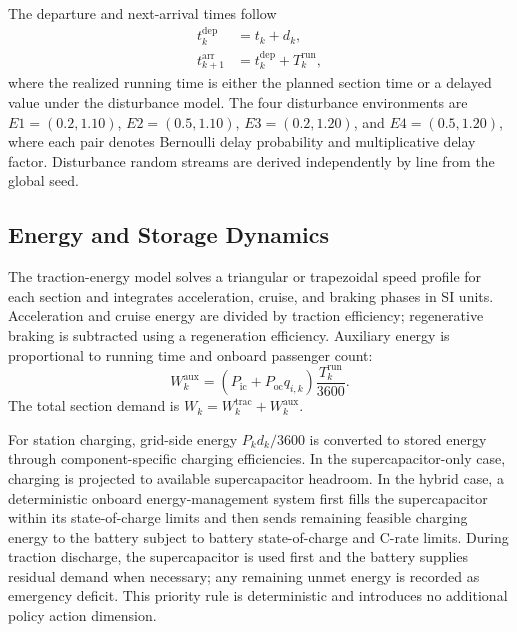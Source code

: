 \documentclass[conference]{IEEEtran}
\begin{document}
The departure and next-arrival times follow
\begin{align}
    t^{\mathrm{dep}}_k &= t_k + d_k, \\
    t^{\mathrm{arr}}_{k+1} &= t^{\mathrm{dep}}_k + T^{\mathrm{run}}_{k},
\end{align}
where the realized running time is either the planned section time or a delayed value under the disturbance model. The four disturbance environments are $E1=(0.2,1.10)$, $E2=(0.5,1.10)$, $E3=(0.2,1.20)$, and $E4=(0.5,1.20)$, where each pair denotes Bernoulli delay probability and multiplicative delay factor. Disturbance random streams are derived independently by line from the global seed.

\subsection{Energy and Storage Dynamics}
The traction-energy model solves a triangular or trapezoidal speed profile for each section and integrates acceleration, cruise, and braking phases in SI units. Acceleration and cruise energy are divided by traction efficiency; regenerative braking is subtracted using a regeneration efficiency. Auxiliary energy is proportional to running time and onboard passenger count:
\begin{equation}
    W^{\mathrm{aux}}_k = \left(P_{\mathrm{ic}} + P_{\mathrm{oc}} q_{i,k}\right)\frac{T^{\mathrm{run}}_k}{3600}.
\end{equation}
The total section demand is $W_k = W^{\mathrm{trac}}_k + W^{\mathrm{aux}}_k$.

For station charging, grid-side energy $P_k d_k/3600$ is converted to stored energy through component-specific charging efficiencies. In the supercapacitor-only case, charging is projected to available supercapacitor headroom. In the hybrid case, a deterministic onboard energy-management system first fills the supercapacitor within its state-of-charge limits and then sends remaining feasible charging energy to the battery subject to battery state-of-charge and C-rate limits. During traction discharge, the supercapacitor is used first and the battery supplies residual demand when necessary; any remaining unmet energy is recorded as emergency deficit. This priority rule is deterministic and introduces no additional policy action dimension.
\end{document}
